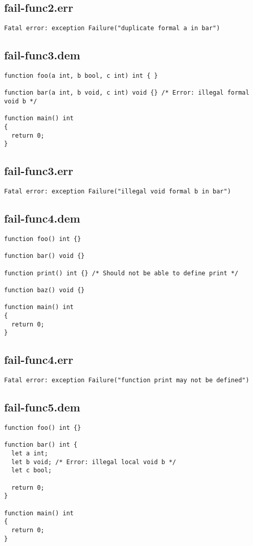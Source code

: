 \subsection{fail-func2.err}
\begin{lstlisting}
Fatal error: exception Failure("duplicate formal a in bar")
\end{lstlisting}
\subsection{fail-func3.dem}
\begin{lstlisting}
function foo(a int, b bool, c int) int { }

function bar(a int, b void, c int) void {} /* Error: illegal formal void b */

function main() int
{
  return 0;
}
\end{lstlisting}
\subsection{fail-func3.err}
\begin{lstlisting}
Fatal error: exception Failure("illegal void formal b in bar")
\end{lstlisting}
\subsection{fail-func4.dem}
\begin{lstlisting}
function foo() int {}

function bar() void {}

function print() int {} /* Should not be able to define print */

function baz() void {}

function main() int
{
  return 0;
}
\end{lstlisting}
\subsection{fail-func4.err}
\begin{lstlisting}
Fatal error: exception Failure("function print may not be defined")
\end{lstlisting}
\subsection{fail-func5.dem}
\begin{lstlisting}
function foo() int {}

function bar() int {
  let a int;
  let b void; /* Error: illegal local void b */
  let c bool;

  return 0;
}

function main() int
{
  return 0;
}
\end{lstlisting}
